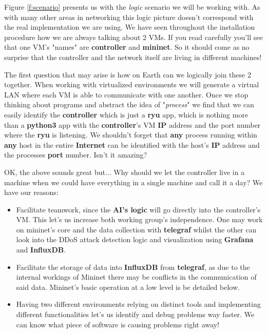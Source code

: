 \documentclass[12pt]{article}
\newcommand{\newpar} {
    \vskip 1cm
}
\begin{document}
	Figure \ref{f:scenario} presents us with the \textit{logic} scenario we will be working with. As with many other areas in networking this logic picture doesn't correspond with the real implementation we are using. We have seen throughout the installation procedure how we are always talking about 2 VMs. If you read carefully you'll see that one VM's "names" are \textbf{controller} and \textbf{mininet}. So it should come as no surprise that the controller and the network itself are living in different machines!
	\newpar
	The first question that may arise is how on Earth can we logically join these 2 together. When working with virtualized environments we will generate a virtual LAN where each VM is able to communicate with one another. Once we stop thinking about programs and abstract the idea of "\textit{process}" we find that we can easily identify the \textbf{controller} which is just a \textbf{ryu} app, which is nothing more than a \textbf{python3} app with the \textbf{controller}'s VM \textbf{IP} address and the port number where the \textbf{ryu} is listening. We shouldn't forget that \textbf{any} process running within \textbf{any} host in the entire \textbf{Internet} can be identified with the host's \textbf{IP} address and the processes \textbf{port} number. Isn't it amazing?
	\newpar
	OK, the above sounds great but... Why should we let the controller live in a machine when we could have everything in a single machine and call it a day? We have our reasons:

	\begin{itemize}
		\item Facilitate teamwork, since the \textbf{AI's logic} will go directly into the controller's VM. This let's us increase both working group's independence. One may work on mininet's core and the data collection with \textbf{telegraf} whilst the other can look into the DDoS attack detection logic and visualization using \textbf{Grafana} and \textbf{InfluxDB}.
		\item Facilitate the storage of data into \textbf{InfluxDB} from \textbf{telegraf}, as due to the internal workings of Mininet there may be conflicts in the communication of said data. Mininet's basic operation at a low level is be detailed below.
		\item Having two different environments relying on distinct tools and implementing different functionalities let's us identify and debug problems way faster. We can know what piece of software is causing problems right away!
	\end{itemize}
\end{document}

